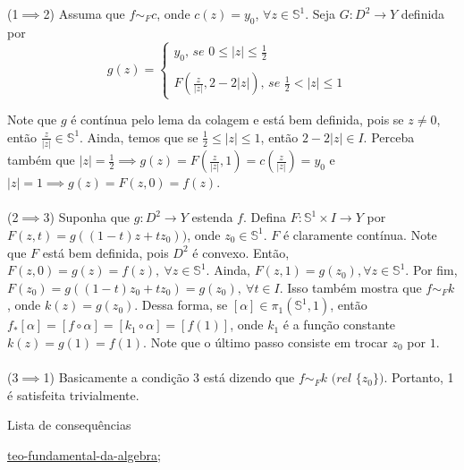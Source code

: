 \begin{dem}
(1$ \implies $2)
    Assuma que $f \sim_F c$, onde $c(z) = y_0$, $\forall z \in \mathbb{S}^1$. Seja $G:D^2 \rightarrow Y$ definida por
   $$g(z) =\begin{cases}
        y_0\textit{, se } 0 \leq |z| \leq \frac{1}{2} &\\
        \\
        F(\frac{z}{|z|}, 2 - 2|z|)\textit{, se } \frac{1}{2} < |z| \leq 1

        
    \end{cases}$$

Note que $g$ é contínua pelo lema da colagem e está bem definida, pois se $z \neq 0$, então $\frac{z}{|z|} \in \mathbb{S}^1$. Ainda, temos que se $\frac{1}{2} \leq |z| \leq 1$, então $2 - 2|z| \in I$. Perceba também que $|z| = \frac{1}{2} \implies g(z) = F(\frac{z}{|z|}, 1) = c(\frac{z}{|z|}) = y_0$ e $|z| = 1 \implies g(z) = F(z, 0) = f(z)$. \\
\\
(2$\implies$3) Suponha que $g:D^2 \rightarrow Y$ estenda $f$. Defina $F:\mathbb{S}^1\times I \rightarrow Y$ por $F(z, t) = g((1 - t)z + tz_0))$, onde $z_0 \in \mathbb{S}^1$. $F$ é claramente contínua. Note que $F$ está bem definida, pois $D^2$ é convexo. Então, $F(z, 0) = g(z) = f(z), \ \forall z \in \mathbb{S}^1$. Ainda, $F(z, 1) = g(z_0), \forall z \in \mathbb{S}^1$. Por fim, $F(z_0) = g((1 - t)z_0 + tz_0) = g(z_0), \ \forall t \in I$. Isso também mostra que $f \sim_F k$, onde $k(z) = g(z_0)$. Dessa forma, se $[\alpha] \in \pi_1(\mathbb{S}^1, 1)$, então $f_*[\alpha] = [f\circ\alpha] = [k_1\circ\alpha] = [f(1)]$, onde $k_1$ é a função constante $k(z) = g(1) = f(1)$. Note que o último passo consiste em trocar $z_0$ por $1$.\\
\\
(3$\implies$1) Basicamente a condição 3 está dizendo que $f \sim_F k \textit{ (rel $\{z_0\}$)}$. Portanto, 1 é satisfeita trivialmente.
    
\end{dem}

\begin{titlemize}{Lista de consequências}
	\item \hyperref[teo-fundamental-da-algebra]{teo-fundamental-da-algebra};
\end{titlemize}












